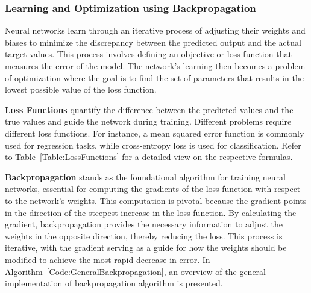 

\subsubsection{Learning and Optimization using Backpropagation}

Neural networks learn through an iterative process of adjusting their weights and biases to minimize the discrepancy between the predicted output and the actual target values. This process involves defining an objective or loss function that measures the error of the model. The network's learning then becomes a problem of optimization where the goal is to find the set of parameters that results in the lowest possible value of the loss function.

\textbf{Loss Functions} quantify the difference between the predicted values and the true values and guide the network during training. Different problems require different loss functions. For instance, a mean squared error function is commonly used for regression tasks, while cross-entropy loss is used for classification. Refer to Table~\ref{Table:LossFunctions} for a detailed view on the respective formulas.



\textbf{Backpropagation} stands as the foundational algorithm for training neural networks, essential for computing the gradients of the loss function with respect to the network's weights. This computation is pivotal because the gradient points in the direction of the steepest increase in the loss function. By calculating the gradient, backpropagation provides the necessary information to adjust the weights in the opposite direction, thereby reducing the loss. This process is iterative, with the gradient serving as a guide for how the weights should be modified to achieve the most rapid decrease in error. In Algorithm~\ref{Code:GeneralBackpropagation}, an overview of the general implementation of backpropagation algorithm is presented.



